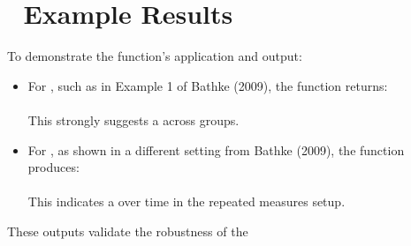 \documentclass[letterpaper,10pt,english]{jupyterBook}
\begin{document}
\section{🔹 Example Results}
\label{\detokenize{function:example-results}}
\sphinxAtStartPar
To demonstrate the function’s application and output:
\begin{itemize}
\item {} 
\sphinxAtStartPar
For , such as in Example 1 of Bathke (2009), the function returns:\\
\\
This strongly suggests a  across groups.

\item {} 
\sphinxAtStartPar
For , as shown in a different setting from Bathke (2009), the function produces:\\
\\
This indicates a  over time in the repeated measures setup.

\end{itemize}

\sphinxAtStartPar
These outputs validate the robustness of the 
\end{document}
